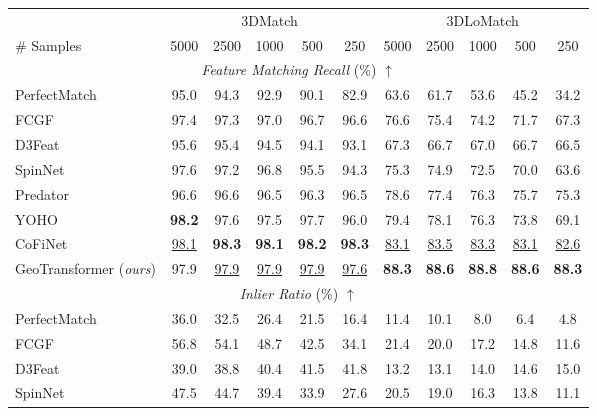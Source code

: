 \begin{table}[!t]
  \setlength{\tabcolsep}{1.8pt}
  \scriptsize
  \centering
  \begin{tabular}{l|ccccc|ccccc}
  \toprule
   & \multicolumn{5}{c|}{3DMatch} & \multicolumn{5}{c}{3DLoMatch} \\
  \# Samples & 5000 & 2500 & 1000 & 500 & 250 & 5000 & 2500 & 1000 & 500 & 250 \\
  \midrule
  \multicolumn{11}{c}{\emph{Feature Matching Recall} (\%) $\uparrow$} \\
  \midrule
  PerfectMatch~\cite{gojcic2019perfect} & 95.0 & 94.3 & 92.9 & 90.1 & 82.9 & 63.6 & 61.7 & 53.6 & 45.2 & 34.2 \\
  FCGF~\cite{choy2019fully} & 97.4 & 97.3 & 97.0 & 96.7 & 96.6 & 76.6 & 75.4 & 74.2 & 71.7 & 67.3 \\
  D3Feat~\cite{bai2020d3feat} & 95.6 & 95.4 & 94.5 & 94.1 & 93.1 & 67.3 & 66.7 & 67.0 & 66.7 & 66.5 \\
  SpinNet~\cite{ao2021spinnet} & 97.6 & 97.2 & 96.8 & 95.5 & 94.3 & 75.3 & 74.9 & 72.5 & 70.0 & 63.6 \\
  Predator~\cite{huang2021predator} & 96.6 & 96.6 & 96.5 & 96.3 & 96.5 & 78.6 & 77.4 & 76.3 & 75.7 & 75.3 \\
  YOHO~\cite{wang2021you} & \textbf{98.2} & 97.6 & 97.5 & 97.7 & 96.0 & 79.4 & 78.1 & 76.3 & 73.8 & 69.1 \\
  CoFiNet~\cite{yu2021cofinet} & \underline{98.1} & \textbf{98.3} & \textbf{98.1} & \textbf{98.2} & \textbf{98.3} & \underline{83.1} & \underline{83.5} & \underline{83.3} & \underline{83.1} & \underline{82.6} \\
  GeoTransformer (\emph{ours}) & 97.9 & \underline{97.9} & \underline{97.9} & \underline{97.9} & \underline{97.6} & \textbf{88.3} & \textbf{88.6} & \textbf{88.8} & \textbf{88.6} & \textbf{88.3} \\ %
  \midrule
  \multicolumn{11}{c}{\emph{Inlier Ratio} (\%) $\uparrow$} \\
  \midrule
  PerfectMatch~\cite{gojcic2019perfect} & 36.0 & 32.5 & 26.4 & 21.5 & 16.4 & 11.4 & 10.1 & 8.0 & 6.4 & 4.8 \\
  FCGF~\cite{choy2019fully} & 56.8 & 54.1 & 48.7 & 42.5 & 34.1 & 21.4 & 20.0 & 17.2 & 14.8 & 11.6 \\
  D3Feat~\cite{bai2020d3feat} & 39.0 & 38.8 & 40.4 & 41.5 & 41.8 & 13.2 & 13.1 & 14.0 & 14.6 & 15.0 \\
  SpinNet~\cite{ao2021spinnet} & 47.5 & 44.7 & 39.4 & 33.9 & 27.6 & 20.5 & 19.0 & 16.3 & 13.8 & 11.1 \\

\end{tabular}
\end{table}

